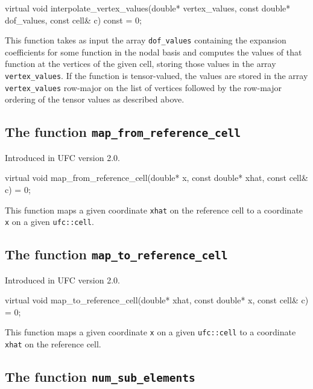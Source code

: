 \begin{code}
virtual void
interpolate_vertex_values(double* vertex_values,
                          const double* dof_values,
                          const cell& c) const = 0;
\end{code}

This function takes as input the array \texttt{dof\_values} containing
the expansion coefficients for some function in the nodal basis and
computes the values of that function at the vertices of the given
cell, storing those values in the array \texttt{vertex\_values}. If
the function is tensor-valued, the values are stored in the array
\texttt{vertex\_values} row-major on the list of vertices followed by the
row-major ordering of the tensor values as described above.

\subsection{The function \texttt{map\_from\_reference\_cell}}
Introduced in UFC version 2.0.

\begin{code}
virtual void map_from_reference_cell(double* x,
                                     const double* xhat,
                                     const cell& c) = 0;
\end{code}

This function maps a given coordinate \texttt{xhat} on the reference
cell to a coordinate \texttt{x} on a given \texttt{ufc::cell}.

\subsection{The function \texttt{map\_to\_reference\_cell}}
Introduced in UFC version 2.0.

\begin{code}
virtual void map_to_reference_cell(double* xhat,
                                   const double* x,
                                   const cell& c) = 0;
\end{code}

This function maps a given coordinate \texttt{x} on a given
\texttt{ufc::cell} to a coordinate \texttt{xhat} on the reference
cell.

\subsection{The function \texttt{num\_sub\_elements}}

